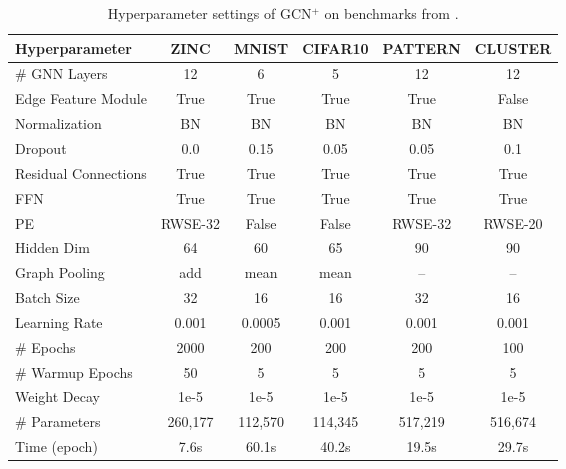 \begin{table*}[h]
	\centering
        \small
         \caption{Hyperparameter settings of GCN$^+$ on benchmarks from \cite{dwivedi2023benchmarking}.}
	\begin{tabular}{lccccc}
		\toprule
		{Hyperparameter} & {ZINC} & {MNIST} & {CIFAR10} & {PATTERN} & {CLUSTER}\\
		\midrule
            \# GNN Layers & 12 & 6 & 5 & 12 & 12 \\
            Edge Feature Module & True & True & True & True & False \\
            Normalization & BN & BN & BN & BN & BN \\
            Dropout & 0.0 & 0.15 & 0.05 & 0.05 & 0.1 \\
            Residual Connections & True & True & True & True & True \\
            FFN & True & True & True & True & True \\
            PE & RWSE-32 & False & False & RWSE-32 & RWSE-20 \\
            Hidden Dim & 64 & 60 & 65 & 90 & 90 \\
            Graph Pooling & add & mean & mean & – & – \\
		\midrule
            Batch Size & 32 & 16 & 16 & 32 & 16 \\
            Learning Rate & 0.001 & 0.0005 & 0.001 & 0.001 & 0.001 \\
            \# Epochs & 2000 & 200 & 200 & 200  & 100 \\
            \# Warmup Epochs & 50 & 5 & 5 & 5 & 5 \\
            Weight Decay & 1e-5 & 1e-5 & 1e-5 & 1e-5 & 1e-5 \\
		\midrule
            \# Parameters & 260,177 & 112,570 & 114,345 & 517,219 & 516,674 \\
            Time (epoch) & 7.6s & 60.1s & 40.2s & 19.5s & 29.7s \\
        \bottomrule
\end{tabular}
	\label{tab:gcn-parameter1}
\end{table*}

